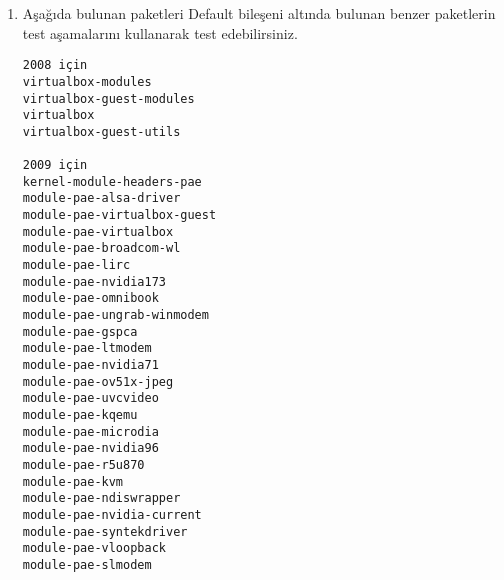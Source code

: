 \documentclass[a4paper,10pt]{article}
\begin{document}
\begin{enumerate}
\item Aşağıda bulunan paketleri Default bileşeni altında bulunan benzer paketlerin test aşamalarını kullanarak test edebilirsiniz.

\begin{verbatim}
2008 için
virtualbox-modules
virtualbox-guest-modules
virtualbox
virtualbox-guest-utils

2009 için
kernel-module-headers-pae
module-pae-alsa-driver
module-pae-virtualbox-guest
module-pae-virtualbox
module-pae-broadcom-wl
module-pae-lirc
module-pae-nvidia173
module-pae-omnibook
module-pae-ungrab-winmodem
module-pae-gspca
module-pae-ltmodem
module-pae-nvidia71
module-pae-ov51x-jpeg
module-pae-uvcvideo
module-pae-kqemu
module-pae-microdia
module-pae-nvidia96
module-pae-r5u870
module-pae-kvm
module-pae-ndiswrapper
module-pae-nvidia-current
module-pae-syntekdriver   
module-pae-vloopback
module-pae-slmodem
\end{verbatim}
\end{enumerate}
\end{document}
